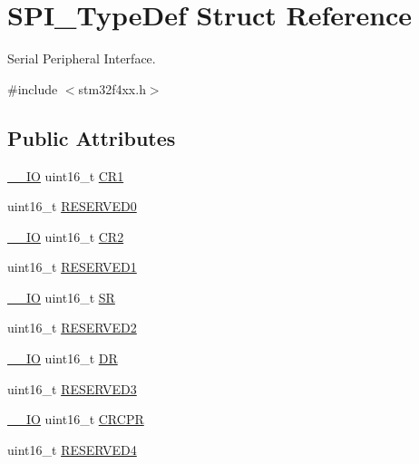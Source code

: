 \hypertarget{struct_s_p_i___type_def}{}\section{S\+P\+I\+\_\+\+Type\+Def Struct Reference}
\label{struct_s_p_i___type_def}


Serial Peripheral Interface.  




{\ttfamily \#include $<$stm32f4xx.\+h$>$}

\subsection*{Public Attributes}
\begin{DoxyCompactItemize}
\item 
\hyperlink{core__cm4_8h_aec43007d9998a0a0e01faede4133d6be}{\+\_\+\+\_\+\+IO} uint16\+\_\+t \hyperlink{struct_s_p_i___type_def_a1e398155ddd013fcdd41309b4bd0bd5f}{C\+R1}
\item 
uint16\+\_\+t \hyperlink{struct_s_p_i___type_def_a7f16c40933b8a713085436be72d30a46}{R\+E\+S\+E\+R\+V\+E\+D0}
\item 
\hyperlink{core__cm4_8h_aec43007d9998a0a0e01faede4133d6be}{\+\_\+\+\_\+\+IO} uint16\+\_\+t \hyperlink{struct_s_p_i___type_def_ac891e34644b8dc27bacc906cfd18b235}{C\+R2}
\item 
uint16\+\_\+t \hyperlink{struct_s_p_i___type_def_a1b7a800c0f56532a431b19cf868e4102}{R\+E\+S\+E\+R\+V\+E\+D1}
\item 
\hyperlink{core__cm4_8h_aec43007d9998a0a0e01faede4133d6be}{\+\_\+\+\_\+\+IO} uint16\+\_\+t \hyperlink{struct_s_p_i___type_def_a017d7d54a7bf1925facea6b5e02fec83}{SR}
\item 
uint16\+\_\+t \hyperlink{struct_s_p_i___type_def_a09ce56649bb5477e2fcf3e92bca8f735}{R\+E\+S\+E\+R\+V\+E\+D2}
\item 
\hyperlink{core__cm4_8h_aec43007d9998a0a0e01faede4133d6be}{\+\_\+\+\_\+\+IO} uint16\+\_\+t \hyperlink{struct_s_p_i___type_def_ae192c943732b6ab5e5611e860cc05544}{DR}
\item 
uint16\+\_\+t \hyperlink{struct_s_p_i___type_def_aeb1d1d561f1d51232369197fa7acb53a}{R\+E\+S\+E\+R\+V\+E\+D3}
\item 
\hyperlink{core__cm4_8h_aec43007d9998a0a0e01faede4133d6be}{\+\_\+\+\_\+\+IO} uint16\+\_\+t \hyperlink{struct_s_p_i___type_def_a353c64e49ec9ae93b950668941f41175}{C\+R\+C\+PR}
\item 
uint16\+\_\+t \hyperlink{struct_s_p_i___type_def_a20e3ac1445ed1e7a9792ca492c46a73a}{R\+E\+S\+E\+R\+V\+E\+D4}

\end{DoxyCompactItemize}
